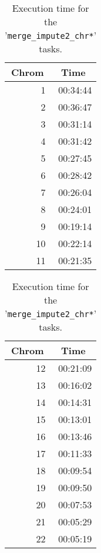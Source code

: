 \documentclass[10pt,twoside,english]{scrartcl}
\begin{document}
\begin{table}[H]
\protect\caption{Execution time for the '\texttt{merge\_impute2\_chr*}' tasks.\label{tab:merge_impute2_exec_time}}

\centering

\begin{tabular}{rr}
\hline 
\multicolumn{1}{c}{\textbf{Chrom}}
 & \multicolumn{1}{c}{\textbf{Time}}
\\
\hline 

1 & {\color{light_gray}00:}34:44\\
2 & {\color{light_gray}00:}36:47\\
3 & {\color{light_gray}00:}31:14\\
4 & {\color{light_gray}00:}31:42\\
5 & {\color{light_gray}00:}27:45\\
6 & {\color{light_gray}00:}28:42\\
7 & {\color{light_gray}00:}26:04\\
8 & {\color{light_gray}00:}24:01\\
9 & {\color{light_gray}00:}19:14\\
10 & {\color{light_gray}00:}22:14\\
11 & {\color{light_gray}00:}21:35\\
\hline 
\end{tabular}
\hspace{1cm}
\begin{tabular}{rr}
\hline 
\multicolumn{1}{c}{\textbf{Chrom}}
 & \multicolumn{1}{c}{\textbf{Time}}
\\
\hline 

12 & {\color{light_gray}00:}21:09\\
13 & {\color{light_gray}00:}16:02\\
14 & {\color{light_gray}00:}14:31\\
15 & {\color{light_gray}00:}13:01\\
16 & {\color{light_gray}00:}13:46\\
17 & {\color{light_gray}00:}11:33\\
18 & {\color{light_gray}00:0}9:54\\
19 & {\color{light_gray}00:0}9:50\\
20 & {\color{light_gray}00:0}7:53\\
21 & {\color{light_gray}00:0}5:29\\
22 & {\color{light_gray}00:0}5:19\\
\hline 
\end{tabular}


\end{table}
\end{document}

